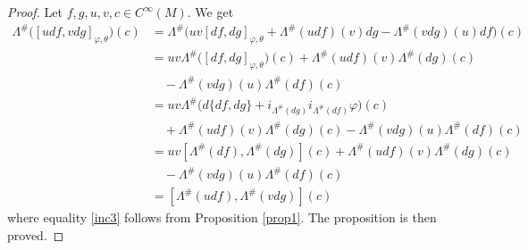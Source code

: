 \documentclass[a4paper,10pt]{article}
\numberwithin{equation}{section}
\theoremstyle{plain}
\begin{document}
		\begin{proof}
			Let $f,g,u ,v,c\in C^\infty(M)$. We get
			\begin{align}\label{inc3}
				\nonumber
				\Lambda^{\#}\big([udf,vdg]_{\varphi,\theta}\big)(c)&=\Lambda^{\#}\Big(uv[df,dg]_ {\varphi,\theta}+\Lambda^{\#}(udf)(v)dg-\Lambda^{\#}(vdg)(u)df\Big)(c)\\ \nonumber
				&=uv\Lambda^{\#}\Big([df,dg]_
				{\varphi,\theta}\Big)(c)+\Lambda^{\#}(udf)(v)\Lambda^{\#}(dg)(c)\\ \nonumber
				&\quad-\Lambda^{\#}(vdg)(u)\Lambda^{\#}(df)(c)\\ \nonumber
				&=uv\Lambda^{\#}\big(d\{df,dg\}+i_{\Lambda^{\#}(dg)}i_{\Lambda^{\#}(df)}\varphi\big)(c)\\ \nonumber
				&\quad+\Lambda^{\#}(udf)(v)\Lambda^{\#}(dg)(c)-\Lambda^{\#}(vdg)(u)\Lambda^{\#}(df)(c)\\ \nonumber
				&=uv[\Lambda^{\#}(df),\Lambda^{\#}(dg)](c)+\Lambda^{\#}(udf)(v)\Lambda^{\#}(dg)(c)\\
				&\quad-\Lambda^{\#}(vdg)(u)\Lambda^{\#}(df)(c)\\  \nonumber
				&=[\Lambda^{\#}(udf),\Lambda^{\#}(vdg)](c)\end{align}
			where equality \eqref{inc3} follows from Proposition \ref{prop1}.
			The proposition is then proved.
			\end{proof}
			
\end{document}
